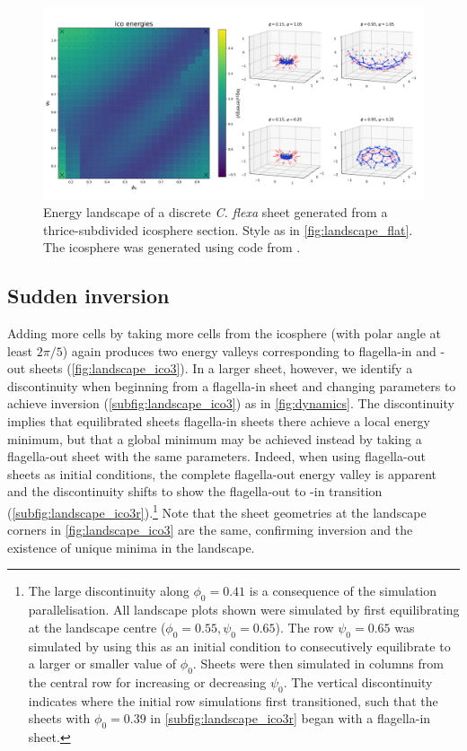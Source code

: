 \begin{figure}[hbtp]
	\centering
	\includegraphics[width=\textwidth]{landscape_ico.png}
	\caption[Energy landscape of a discrete \textit{C. flexa} sheet generated from a small icosphere section]{Energy landscape of a discrete \textit{C. flexa} sheet generated from a thrice-subdivided icosphere section. Style as in \cref{fig:landscape_flat}. The icosphere was generated using code from \citep{dahl2014}.}
	\label{fig:landscape_ico}
\end{figure}

\subsection{Sudden inversion}

Adding more cells by taking more cells from the icosphere (with polar angle at least $2\pi/5$) again produces two energy valleys corresponding to flagella-in and -out sheets (\cref{fig:landscape_ico3}). 
In a larger sheet, however, we identify a discontinuity when beginning from a flagella-in sheet and changing parameters to achieve inversion (\cref{subfig:landscape_ico3}) as in \cref{fig:dynamics}.
The discontinuity implies that equilibrated sheets flagella-in sheets there achieve a local energy minimum, but that a global minimum may be achieved instead by taking a flagella-out sheet with the same parameters. 
Indeed, when using flagella-out sheets as initial conditions, the complete flagella-out energy valley is apparent and the discontinuity shifts to show the flagella-out to -in transition (\cref{subfig:landscape_ico3r}).\footnote{The large discontinuity along $\phi_0=0.41$ is a consequence of the simulation parallelisation. All landscape plots shown were simulated by first equilibrating at the landscape centre ($\phi_0=0.55,\psi_0=0.65$). The row $\psi_0=0.65$ was simulated by using this as an initial condition to consecutively equilibrate to a larger or smaller value of $\phi_0$. Sheets were then simulated in columns from the central row for increasing or decreasing $\psi_0$. The vertical discontinuity indicates where the initial row simulations first transitioned, such that the sheets with $\phi_0=0.39$ in \cref{subfig:landscape_ico3r} began with a flagella-in sheet.}
Note that the sheet geometries at the landscape corners in \cref{fig:landscape_ico3} are the same, confirming inversion and the existence of unique minima in the landscape.

